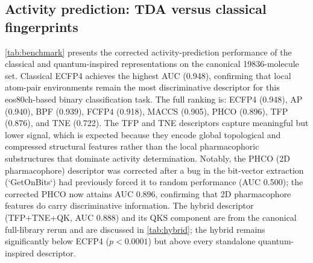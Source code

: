 \documentclass[11pt,a4paper]{article}
\begin{document}
\subsection{Activity prediction: TDA versus classical fingerprints}

\cref{tab:benchmark} presents the corrected activity-prediction performance of the classical and quantum-inspired representations on the canonical \num{19836}-molecule set. Classical ECFP4 achieves the highest AUC (\num{0.948}), confirming that local atom-pair environments remain the most discriminative descriptor for this eos80ch-based binary classification task. The full ranking is: ECFP4 (\num{0.948}), AP (\num{0.940}), BPF (\num{0.939}), FCFP4 (\num{0.918}), MACCS (\num{0.905}), PHCO (\num{0.896}), TFP (\num{0.876}), and TNE (\num{0.722}). The TFP and TNE descriptors capture meaningful but lower signal, which is expected because they encode global topological and compressed structural features rather than the local pharmacophoric substructures that dominate activity determination. Notably, the PHCO (2D pharmacophore) descriptor was corrected after a bug in the bit-vector extraction (`GetOnBits`) had previously forced it to random performance (AUC \num{0.500}); the corrected PHCO now attains AUC \num{0.896}, confirming that 2D pharmacophore features do carry discriminative information. The hybrid descriptor (TFP+TNE+QK, AUC \num{0.888}) and its QKS component are from the canonical full-library rerun and are discussed in \cref{tab:hybrid}; the hybrid remains significantly below ECFP4 ($p < 0.0001$) but above every standalone quantum-inspired descriptor.
\end{document}
